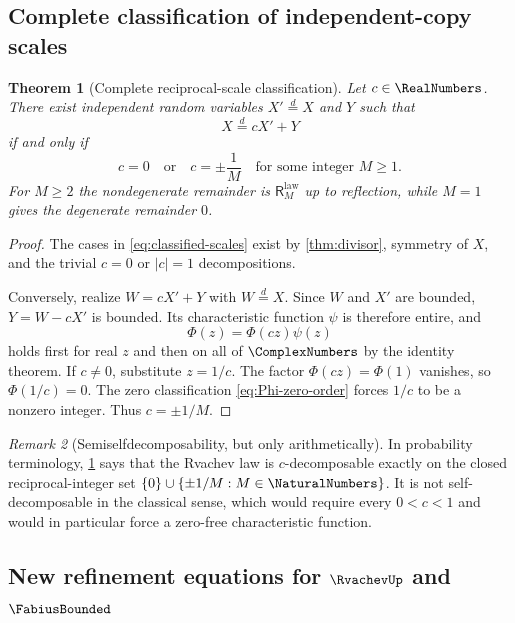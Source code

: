 \documentclass[11pt,oneside]{article}
\newtheorem{theorem}{Theorem}[section]
\theoremstyle{definition}
\theoremstyle{remark}
\newtheorem{remark}[theorem]{Remark}
\newcommand{\ReciprocalIntegerLaw}[1]{\mathsf R^{\mathrm{law}}_{#1}}
\begin{document}
\subsection{Complete classification of independent-copy scales}

\begin{theorem}[Complete reciprocal-scale classification]
\label{thm:classification}
Let $c\in\RealNumbers$.  There exist independent random variables $X'\overset d=X$ and $Y$ such
that
\begin{equation}
 X\overset d=cX'+Y
 \label{eq:c-decomp}
\end{equation}
if and only if
\begin{equation}
 c=0
 \quad\text{or}\quad
 c=\pm\frac1M
 \quad\text{for some integer }M\ge1.
 \label{eq:classified-scales}
\end{equation}
For $M\ge2$ the nondegenerate remainder is $\ReciprocalIntegerLaw{M}$ up to reflection, while $M=1$
gives the degenerate remainder $0$.
\end{theorem}

\begin{proof}
The cases in \eqref{eq:classified-scales} exist by \cref{thm:divisor}, symmetry of $X$,
and the trivial $c=0$ or $|c|=1$ decompositions.

Conversely, realize $W=cX'+Y$ with $W\overset d=X$.  Since $W$ and $X'$ are bounded,
$Y=W-cX'$ is bounded.  Its characteristic function $\psi$ is therefore entire, and
\begin{equation}
 \Phi(z)=\Phi(cz)\psi(z)
 \label{eq:entire-factorization}
\end{equation}
holds first for real $z$ and then on all of $\ComplexNumbers$ by the identity theorem.  If $c\ne0$,
substitute $z=1/c$.  The factor $\Phi(cz)=\Phi(1)$ vanishes, so $\Phi(1/c)=0$.
The zero classification \eqref{eq:Phi-zero-order} forces $1/c$ to be a nonzero integer.
Thus $c=\pm1/M$.
\end{proof}

\begin{remark}[Semiselfdecomposability, but only arithmetically]
In probability terminology, \cref{thm:classification} says that the Rvachev law is
$c$-decomposable exactly on the closed reciprocal-integer set
$\{0\}\cup\{\pm1/M:M\in\NaturalNumbers\}$.  It is not self-decomposable in the classical sense,
which would require every $0<c<1$ and would in particular force a zero-free
characteristic function.
\end{remark}

\subsection{New refinement equations for $\RvachevUp$ and $\FabiusBounded$}
\end{document}
